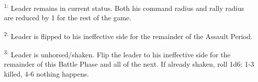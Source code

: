 \textsuperscript{1:} Leader remains in current status. Both his command radius and rally radius are reduced by 1 for the rest of the game.

\textsuperscript{2:} Leader is flipped to his ineffective side for the remainder of the Assault Period.

\textsuperscript{3:} Leader is unhorsed/shaken. Flip the leader to his ineffective side for the remainder of this Battle Phase and all of the next. If already shaken, roll 1d6: 1-3 killed, 4-6 nothing happens.